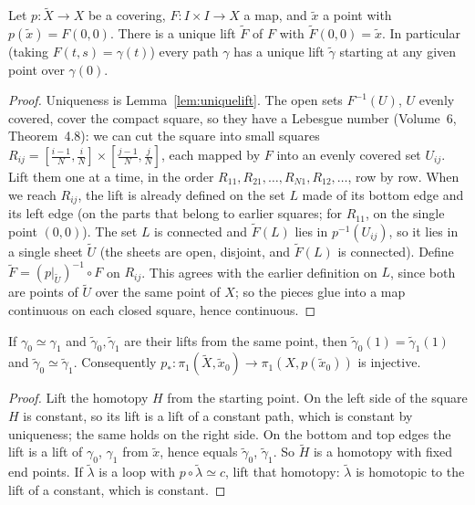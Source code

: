 \begin{theorem}\label{thm:homotopylifting}
Let $p\colon\tilde X\to X$ be a covering, $F\colon I\times I\to X$ a map, and $\tilde x$ a point with $p(\tilde x)=F(0,0)$. There is a unique lift $\tilde F$ of $F$ with $\tilde F(0,0)=\tilde x$. In particular
(taking $F(t,s)=\gamma(t)$) every path $\gamma$ has a unique lift $\tilde\gamma$ starting at any given point over $\gamma(0)$.
\end{theorem}

\begin{proof}
Uniqueness is Lemma~\ref{lem:uniquelift}. The open sets $F^{-1}(U)$, $U$ evenly covered, cover the compact square, so they have a Lebesgue number (Volume~6, Theorem~4.8): we can cut
the square into small squares $R_{ij}=[\frac{i-1}N,\frac iN]\times[\frac{j-1}N,\frac jN]$, each mapped by $F$ into an evenly covered set $U_{ij}$. Lift them one at a time, in the order
$R_{11},R_{21},\dots,R_{N1},R_{12},\dots$, row by row. When we reach $R_{ij}$, the lift is already defined on the set $L$ made of its bottom edge and its left edge (on the parts that
belong to earlier squares; for $R_{11}$, on the single point $(0,0)$). The set $L$ is connected and $\tilde F(L)$ lies in $p^{-1}(U_{ij})$, so it lies in a single sheet $\tilde U$ (the sheets are
open, disjoint, and $\tilde F(L)$ is connected). Define $\tilde F=(p|_{\tilde U})^{-1}\circ F$ on $R_{ij}$. This agrees with the earlier definition on $L$, since both are points of $\tilde U$ over the same
point of $X$; so the pieces glue into a map continuous on each closed square, hence continuous.
\end{proof}

\begin{corollary}\label{cor:liftendpoints}
If $\gamma_0\simeq\gamma_1$ and $\tilde\gamma_0,\tilde\gamma_1$ are their lifts from the same point, then $\tilde\gamma_0(1)=\tilde\gamma_1(1)$ and $\tilde\gamma_0\simeq\tilde\gamma_1$. Consequently
$p_*\colon\pi_1(\tilde X,\tilde x_0)\to\pi_1(X,p(\tilde x_0))$ is injective.
\end{corollary}

\begin{proof}
Lift the homotopy $H$ from the starting point. On the left side of the square $H$ is constant, so its lift is a lift of a constant path, which is constant by uniqueness; the same holds on the
right side. On the bottom and top edges the lift is a lift of $\gamma_0$, $\gamma_1$ from $\tilde x$, hence equals $\tilde\gamma_0$, $\tilde\gamma_1$. So $\tilde H$ is a homotopy with fixed end points. If $\tilde\lambda$ is
a loop with $p\circ\tilde\lambda\simeq c$, lift that homotopy: $\tilde\lambda$ is homotopic to the lift of a constant, which is constant.
\end{proof}

